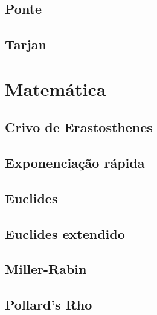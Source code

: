 \documentclass[12pt]{article}
\begin{document}
\subsection{Ponte}


\subsection{Tarjan}




%
%

\section{Matemática}

\subsection{Crivo de Erastosthenes}


\subsection{Exponenciação rápida}


\subsection{Euclides}


\subsection{Euclides extendido}


\subsection{Miller-Rabin}


\subsection{Pollard's Rho}

\end{document}
